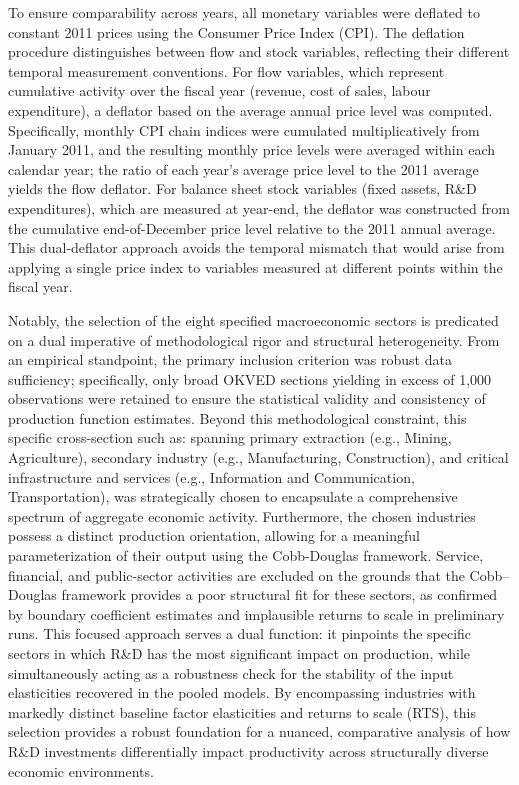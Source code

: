 \documentclass[a4paper, 12pt]{article}
\begin{document}
To ensure comparability across years, all monetary variables were deflated to constant 2011 prices using the Consumer Price Index (CPI). The deflation procedure distinguishes between flow and stock variables, reflecting their different temporal measurement conventions. For flow variables, which represent cumulative activity over the fiscal year (revenue, cost of sales, labour expenditure), a deflator based on the average annual price level was computed. Specifically, monthly CPI chain indices were cumulated multiplicatively from January 2011, and the resulting monthly price levels were averaged within each calendar year; the ratio of each year's average price level to the 2011 average yields the flow deflator. For balance sheet stock variables (fixed assets, R\&D expenditures), which are measured at year-end, the deflator was constructed from the cumulative end-of-December price level relative to the 2011 annual average. This dual-deflator approach avoids the temporal mismatch that would arise from applying a single price index to variables measured at different points within the fiscal year.

Notably, the selection of the eight specified macroeconomic sectors is predicated on a dual imperative of methodological rigor and structural heterogeneity. From an empirical standpoint, the primary inclusion criterion was robust data sufficiency; specifically, only broad OKVED sections yielding in excess of 1,000 observations were retained to ensure the statistical validity and consistency of production function estimates. 
Beyond this methodological constraint, this specific cross-section such as: spanning primary extraction (e.g., Mining, Agriculture), secondary industry (e.g., Manufacturing, Construction), and critical infrastructure and services (e.g., Information and Communication, Transportation), was strategically chosen to encapsulate a comprehensive spectrum of aggregate economic activity. 
Furthermore, the chosen industries possess a distinct production orientation, allowing for a meaningful parameterization of their output using the Cobb-Douglas framework. 
Service, financial, and public-sector activities are excluded on the grounds that the Cobb--Douglas framework provides a poor structural fit for these sectors, as confirmed by boundary coefficient estimates and implausible returns to scale in preliminary runs. This focused approach serves a dual function: it pinpoints the specific sectors in which R\&D has the most significant impact on production, while simultaneously acting as a robustness check for the stability of the input elasticities recovered in the pooled models.
By encompassing industries with markedly distinct baseline factor elasticities and returns to scale (RTS), this selection provides a robust foundation for a nuanced, comparative analysis of how R\&D investments differentially impact productivity across structurally diverse economic environments.
\end{document}
